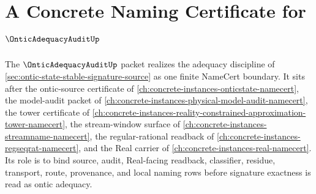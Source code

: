 \chapter{A Concrete Naming Certificate for $\OnticAdequacyAuditUp$}
\label{ch:concrete-instances-ontic-adequacy-audit-namecert}

The $\OnticAdequacyAuditUp$ packet realizes the adequacy discipline of \autoref{sec:ontic-state-stable-signature-source} as one finite NameCert boundary. It sits after the ontic-source certificate of \autoref{ch:concrete-instances-onticstate-namecert}, the model-audit packet of \autoref{ch:concrete-instances-physical-model-audit-namecert}, the tower certificate of \autoref{ch:concrete-instances-reality-constrained-approximation-tower-namecert}, the stream-window surface of \autoref{ch:concrete-instances-streamname-namecert}, the regular-rational readback of \autoref{ch:concrete-instances-regseqrat-namecert}, and the Real carrier of \autoref{ch:concrete-instances-real-namecert}. Its role is to bind source, audit, Real-facing readback, classifier, residue, transport, route, provenance, and local naming rows before signature exactness is read as ontic adequacy.

